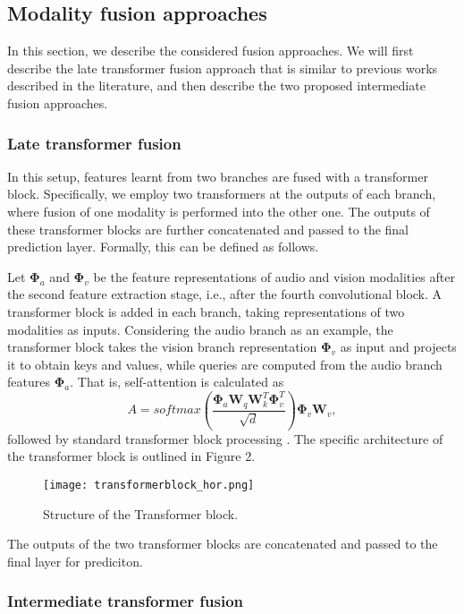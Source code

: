 \documentclass[a4paper,conference]{IEEEtran}
\begin{document}
\subsection{Modality fusion approaches}

In this section, we describe the considered fusion approaches. We will first describe the late transformer fusion approach that is similar to previous works described in the literature, and then describe the two proposed intermediate fusion approaches. 

\subsubsection{Late transformer fusion}

In this setup, features learnt from two branches are fused with a transformer block. Specifically, we employ two transformers at the outputs of each branch, where fusion of one modality is performed into the other one. The outputs of these transformer blocks are further concatenated and passed to the final prediction layer. Formally, this can be defined as follows.

Let $\bm{\Phi}_a$ and $\bm{\Phi}_v$ be the feature representations of audio and vision modalities after the second feature extraction stage, i.e., after the fourth convolutional block. A transformer block is added in each branch, taking representations of two modalities as inputs. Considering the audio branch as an example, the transformer block takes the vision branch representation $\bm{\Phi}_v$ as input and projects it to obtain keys and values, while queries are computed from the audio branch features $\bm{\Phi}_a$. That is, self-attention is calculated as
\begin{equation}
A = softmax\left(\frac{ \bm{\Phi}_a\mathbf{W}_q\mathbf{W}_k^T \bm{\Phi}_v^T}{\sqrt{d}}\right)\bm{\Phi}_v\mathbf{W}_v,
\end{equation}
followed by standard transformer block processing \cite{vaswani}. The specific architecture of the transformer block is outlined in Figure 2.

\begin{figure}[h]
\centering
\texttt{[image: transformerblock\_hor.png]}
\caption{Structure of the Transformer block.}
\end{figure}

The outputs of the two transformer blocks are concatenated and passed to the final layer for prediciton.


\subsubsection{Intermediate transformer fusion}
\end{document}
